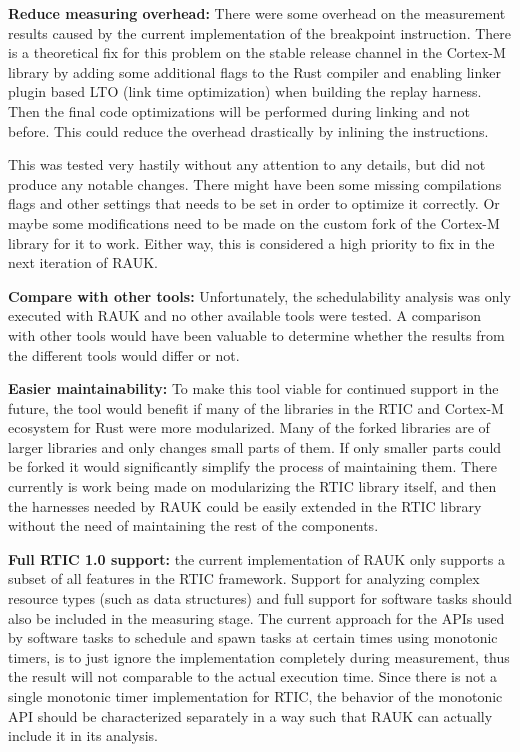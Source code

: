 \textbf{Reduce measuring overhead:} There were some overhead on the measurement
results caused by the current implementation of the breakpoint instruction.
There is a theoretical fix for this problem on the stable release channel in
the Cortex-M library by adding some additional flags to the Rust compiler and
enabling linker plugin based LTO (link time optimization) when building the
replay harness. Then the final code optimizations will be performed during
linking and not before. This could reduce the overhead drastically by inlining
the instructions. 

This was tested very hastily without any attention to any details, but did not
produce any notable changes. There might have been some missing compilations
flags and other settings that needs to be set in order to optimize it
correctly. Or maybe some modifications need to be made on the custom fork of
the Cortex-M library for it to work. Either way, this is considered a high
priority to fix in the next iteration of RAUK\@.

\textbf{Compare with other tools:} Unfortunately, the schedulability analysis
was only executed with RAUK and no other available tools were tested. A
comparison with other tools would have been valuable to determine whether the
results from the different tools would differ or not. 

\textbf{Easier maintainability:} To make this tool viable for continued support
in the future, the tool would benefit if many of the libraries in the RTIC and
Cortex-M ecosystem for Rust were more modularized. Many of the forked libraries
are of larger libraries and only changes small parts of them. If only smaller
parts could be forked it would significantly simplify the process of
maintaining them. There currently is work being made on modularizing the RTIC
library itself, and then the harnesses needed by RAUK could be easily extended
in the RTIC library without the need of maintaining the rest of the components.

\textbf{Full RTIC 1.0 support:} the current implementation of RAUK only supports
a subset of all features in the RTIC framework. Support for analyzing complex
resource types (such as data structures) and full support for software tasks
should also be included in the measuring stage. The current approach for the APIs
used by software tasks to schedule and spawn tasks at certain times using
monotonic timers, is to just ignore the implementation completely during
measurement, thus the result will not comparable to the actual execution time.
Since there is not a single monotonic timer implementation for RTIC, the
behavior of the monotonic API should be characterized separately in a way such
that RAUK can actually include it in its analysis.

